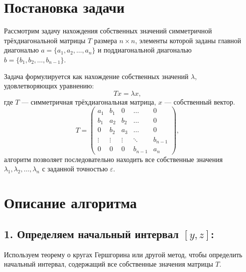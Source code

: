 \documentclass{article}
\begin{document}
\newpage



\section{Постановка задачи}

Рассмотрим задачу нахождения собственных значений симметричной трёхдиагональной матрицы $T$ размера $n \times n$, элементы которой заданы главной диагональю $a = \{a_1, a_2, \dots, a_n\}$ и поддиагональной диагональю $b = \{b_1, b_2, \dots, b_{n-1}\}$. 

Задача формулируется как нахождение собственных значений $\lambda$, удовлетворяющих уравнению:
\[
T x = \lambda x,
\]
где $T$ — симметричная трёхдиагональная матрица, $x$ — собственный вектор.
\[
T = 
\begin{pmatrix}
a_1 & b_1 & 0 & \dots & 0 \\
b_1 & a_2 & b_2 & \dots & 0 \\
0 & b_2 & a_3 & \dots & 0 \\
\vdots & \vdots & \vdots & \ddots & b_{n-1} \\
0 & 0 & 0 & b_{n-1} & a_n
\end{pmatrix},
\]
алгоритм позволяет последовательно находить все собственные значения $\lambda_1, \lambda_2, \dots, \lambda_n$ с заданной точностью $\varepsilon$.
\section*{Описание алгоритма}

\subsection*{1. Определяем начальный интервал $[y, z]$:}
Используем теорему о кругах Гершгорина или другой метод, чтобы определить начальный интервал, содержащий все собственные значения матрицы $T$.
\end{document}
